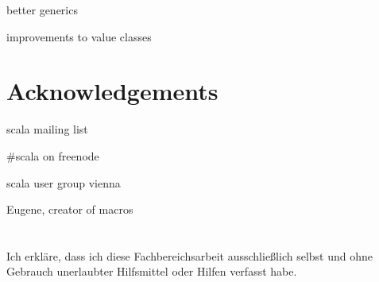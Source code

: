 \documentclass[12pt,oneside,a4paper]{scrbook}
\begin{document}
better generics

improvements to value classes


\chapter{Acknowledgements}
scala mailing list

\#scala on freenode

scala user group vienna

Eugene, creator of macros


\singlespacing

{}

\chapter*{}
\onehalfspacing
Ich erkläre, dass ich diese Fachbereichsarbeit ausschließlich selbst und ohne Gebrauch unerlaubter Hilfsmittel oder Hilfen verfasst habe.
\end{document}
